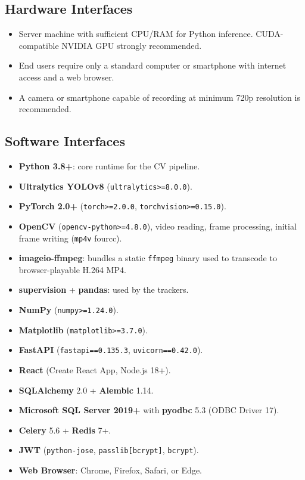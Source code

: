﻿\documentclass[11pt,a4paper]{article}
\begin{document}
\subsection{Hardware Interfaces}
\begin{itemize}[leftmargin=*]
    \item Server machine with sufficient CPU/RAM for Python inference. CUDA-compatible NVIDIA GPU strongly recommended.
    \item End users require only a standard computer or smartphone with internet access and a web browser.
    \item A camera or smartphone capable of recording at minimum 720p resolution is recommended.
\end{itemize}

\subsection{Software Interfaces}
\begin{itemize}[leftmargin=*]
    \item \textbf{Python 3.8+}: core runtime for the CV pipeline.
    \item \textbf{Ultralytics YOLOv8} (\texttt{ultralytics>=8.0.0}).
    \item \textbf{PyTorch 2.0+} (\texttt{torch>=2.0.0}, \texttt{torchvision>=0.15.0}).
    \item \textbf{OpenCV} (\texttt{opencv-python>=4.8.0}), video reading, frame processing, initial frame writing (\texttt{mp4v} fourcc).
    \item \textbf{imageio-ffmpeg}: bundles a static \texttt{ffmpeg} binary used to transcode to browser-playable H.264 MP4.
    \item \textbf{supervision} + \textbf{pandas}: used by the trackers.
    \item \textbf{NumPy} (\texttt{numpy>=1.24.0}).
    \item \textbf{Matplotlib} (\texttt{matplotlib>=3.7.0}).
    \item \textbf{FastAPI} (\texttt{fastapi==0.135.3}, \texttt{uvicorn==0.42.0}).
    \item \textbf{React} (Create React App, Node.js 18+).
    \item \textbf{SQLAlchemy} 2.0 + \textbf{Alembic} 1.14.
    \item \textbf{Microsoft SQL Server 2019+} with \textbf{pyodbc} 5.3 (ODBC Driver 17).
    \item \textbf{Celery} 5.6 + \textbf{Redis} 7+.
    \item \textbf{JWT} (\texttt{python-jose}, \texttt{passlib[bcrypt]}, \texttt{bcrypt}).
    \item \textbf{Web Browser}: Chrome, Firefox, Safari, or Edge.
\end{itemize}
\end{document}
